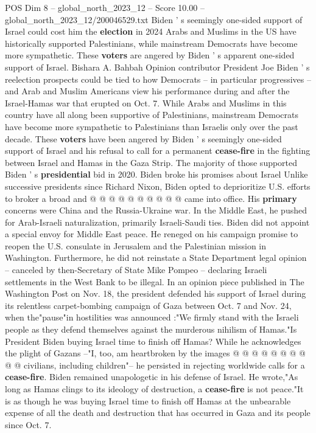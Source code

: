 \begin{textsample}{POS Dim 8 – global\_north\_2023\_12 – Score 10.00 – global\_north\_2023\_12/200046529.txt}  \label{ex:f8_pos_113}
Biden ' s seemingly one-sided support of Israel could cost him the \textbf{election} in 2024 Arabs and Muslims in the US have historically supported Palestinians, while mainstream Democrats have become more sympathetic.
These \textbf{voters} are angered by Biden ' s apparent one-sided support of Israel.
Bishara A.
Bahbah Opinion contributor President Joe Biden ' s reelection prospects could be tied to how Democrats -- in particular progressives -- and Arab and Muslim Americans view his performance during and after the Israel-Hamas war that erupted on Oct. 7.
While Arabs and Muslims in this country have all along been supportive of Palestinians, mainstream Democrats have become more sympathetic to Palestinians than Israelis only over the past decade.
These \textbf{voters} have been angered by Biden ' s seemingly one-sided support of Israel and his refusal to call for a permanent \textbf{cease-fire} in the fighting between Israel and Hamas in the Gaza Strip.
The majority of those supported Biden ' s \textbf{presidential} bid in 2020.
Biden broke his promises about Israel Unlike successive presidents since Richard Nixon, Biden opted to deprioritize U.S. efforts to broker a broad and @ @ @ @ @ @ @ @ @ @ came into office.
His \textbf{primary} concerns were China and the Russia-Ukraine war.
In the Middle East, he pushed for Arab-Israeli naturalization, primarily Israeli-Saudi ties.
Biden did not appoint a special envoy for Middle East peace.
He reneged on his campaign promise to reopen the U.S. consulate in Jerusalem and the Palestinian mission in Washington.
Furthermore, he did not reinstate a State Department legal opinion -- canceled by then-Secretary of State Mike Pompeo -- declaring Israeli settlements in the West Bank to be illegal.
In an opinion piece published in The Washington Post on Nov. 18, the president defended his support of Israel during its relentless carpet-bombing campaign of Gaza between Oct. 7 and Nov. 24, when the"pause"in hostilities was announced :"We firmly stand with the Israeli people as they defend themselves against the murderous nihilism of Hamas."Is President Biden buying Israel time to finish off Hamas?
While he acknowledges the plight of Gazans --"I, too, am heartbroken by the images @ @ @ @ @ @ @ @ @ @ civilians, including children"-- he persisted in rejecting worldwide calls for a \textbf{cease-fire}.
Biden remained unapologetic in his defense of Israel.
He wrote,"As long as Hamas clings to its ideology of destruction, a \textbf{cease-fire} is not peace."It is as though he was buying Israel time to finish off Hamas at the unbearable expense of all the death and destruction that has occurred in Gaza and its people since Oct. 7.

\end{textsample}
